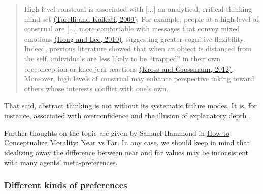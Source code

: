 \begin{quote}
High-level construal is associated with {[}...{]} an analytical,
critical-thinking mind-set
\href{http://citeseerx.ist.psu.edu/viewdoc/download?doi=10.1.1.186.6465\&rep=rep1\&type=pdf}{(Torelli
and Kaikati, 2009)}. For example, people at a high level of construal
are {[}...{]} more comfortable with messages that convey mixed emotions
\href{http://www.bm.ust.hk/mark/staff/Jiewen/Jiewen\%20JCR-Oct\%202010.pdf}{(Hong
and Lee, 2010)}, suggesting greater cognitive flexibility. Indeed,
previous literature showed that when an object is distanced from the
self, individuals are less likely to be ``trapped'' in their own
preconception or knee-jerk reactions
\href{https://uwaterloo.ca/wisdom-and-culture-lab/sites/ca.wisdom-and-culture-lab/files/uploads/files/kross_grossmann_jepg_2012.pdf}{(Kross
and Grossmann, 2012)}. Moreover, high levels of construal may enhance
perspective taking toward others whose interests conflict with one's
own.
\end{quote}

That said, abstract thinking is not without its systematic failure
modes. It is, for instance, associated with
\href{https://en.wikipedia.org/wiki/Overconfidence_effect}{overconfidence}
and the \href{https://www.edge.org/response-detail/27117}{illusion
of explanatory depth} \parencite{Alter2010-lu}.

Further thoughts on the topic are given by Samuel Hammond in
\href{http://abstractminutiae.com/post/85550239565/how-to-conceptualize-morality-near-vs-far}{How
to Conceptualize Morality: Near vs Far}. In any case, we should keep
in mind that idealizing away the difference between near and far values
may be inconsistent with many agents' meta-preferences.

\subsubsection{Different kinds of
preferences}\label{different-kinds-of-preferences}

